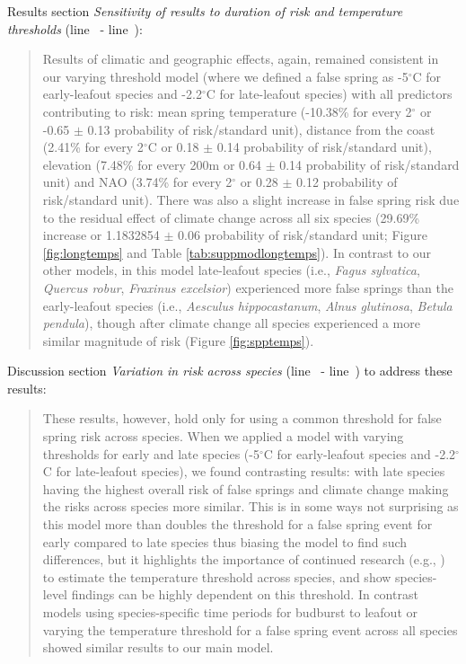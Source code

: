 \documentclass[11pt,a4paper]{article}\usepackage[]{graphicx}\usepackage[]{color}
\newcommand{\lr}[1]{line~\lineref{#1}}
\begin{document}
Results section \textit{Sensitivity of results to duration of risk and temperature thresholds} (\lr{Z2thresh} - \lr{Z2threshend}): \\

\begin{quotation}
\noindent  Results of climatic and geographic effects, again, remained consistent in our varying threshold model (where we defined a false spring as -5$^{\circ}$C for early-leafout species and -2.2$^{\circ}$C for late-leafout species) with all predictors contributing to risk: mean spring temperature (-10.38\% for every 2$^\circ$ or -0.65 $\pm$ 0.13 probability of risk/standard unit), distance from the coast (2.41\% for every 2$^\circ$C or 0.18 $\pm$ 0.14 probability of risk/standard unit), elevation (7.48\% for every 200m or 0.64 $\pm$ 0.14 probability of risk/standard unit) and NAO (3.74\% for every 2$^\circ$ or 0.28 $\pm$ 0.12 probability of risk/standard unit). There was also a slight increase in false spring risk due to the residual effect of climate change across all six species (29.69\% increase or 1.1832854 $\pm$ 0.06 probability of risk/standard unit; Figure \ref{fig:longtemps} and Table \ref{tab:suppmodlongtemps}). In contrast to our other models, in this model late-leafout species (i.e., \textit{Fagus sylvatica}, \textit{Quercus robur}, \textit{Fraxinus excelsior}) experienced more false springs than the early-leafout species (i.e., \textit{Aesculus hippocastanum}, \textit{Alnus glutinosa}, \textit{Betula pendula}), though after climate change all species experienced a more similar magnitude of risk (Figure \ref{fig:spptemps}). 
\end{quotation}

Discussion section \textit{Variation in risk across species} (\lr{Z3thresh} - \lr{Z3threshend}) to address these results:

\begin{quotation}
\noindent These results, however, hold only for using a common threshold for false spring risk across species. When we applied a model with varying thresholds for early and late species (-5$^{\circ}$C for early-leafout species and -2.2$^{\circ}$C for late-leafout species), we found contrasting results: with late species having the highest overall risk of false springs and climate change making the risks across species more similar. This is in some ways not surprising as this model more than doubles the threshold for a false spring event for early compared to late species thus biasing the model to find such differences, but it highlights the importance of continued research (e.g., \citep{Lenz2013,Muffler2016,Zohner2020}) to estimate the temperature threshold across species, and show species-level findings can be highly dependent on this threshold. In contrast models using species-specific time periods for budburst to leafout or varying the temperature threshold for a false spring event across all species showed similar results to our main model.
\end{quotation}
\end{document}
